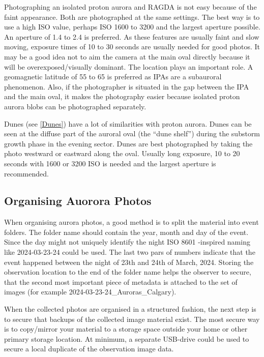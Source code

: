 \documentclass{article}
\begin{document}
Photographing an isolated proton aurora and RAGDA is not easy because of the faint appearance. Both are photographed at the same settings. The best way is to use a high ISO value, perhaps ISO 1600 to 3200 and the largest aperture possible. An aperture of 1.4 to 2.4 is preferred. As these features are usually faint and slow moving, exposure times of 10 to 30 seconds are usually needed for good photos. It may be a good idea not to aim the camera at the main oval directly because it will be overexposed/visually dominant. The location plays an important role. A geomagnetic latitude of 55 to 65 is preferred as IPAs are a subauroral phenomenon. Also, if the photographer is situated in the gap between the IPA and the main oval, it makes the photography easier because isolated proton aurora blobs can be photographed separately.

Dunes (see \ref{Dunes}) have a lot of similarities with proton aurora. Dunes can be seen at the diffuse part of the auroral oval (the ``dune shelf'') during the substorm growth phase in the evening sector. Dunes are best photographed by taking the photo westward or eastward along the oval. Usually long exposure, 10 to 20 seconds with 1600 or 3200 ISO is needed and the largest aperture is recommended.


\subsection{Organising Auorora Photos}\label{sec:data_cit_storage}

When organising aurora photos, a good method is to split the material into event folders. The folder name should contain the year, month and day of the event. Since the day might not uniquely identify the night ISO 8601 -inspired naming like 2024-03-23-24 could be used. The last two pars of numbers indicate that the event happened between the night of 23th and 24th of March, 2024. Storing the observation location to the end of the folder name helps the observer to secure, that the second most important piece of metadata is attached to the set of images (for example 2024-03-23-24\_Auroras\_Calgary).

When the collected photos are organised in a structured fashion, the next step is to secure that backups of the collected image material exist. The most secure way is to copy/mirror your material to a storage space outside your home or other primary storage location. At minimum, a separate USB-drive could be used to secure a local duplicate of the observation image data.
\end{document}
